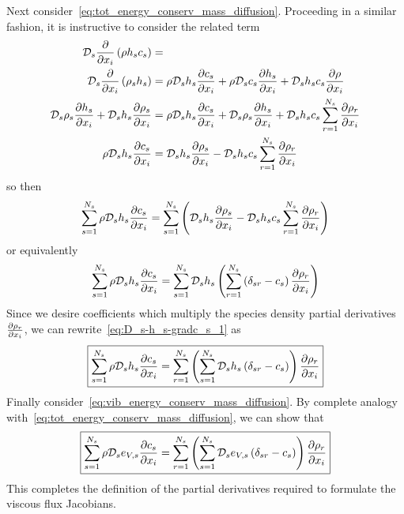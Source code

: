 Next consider~\eqref{eq:tot_energy_conserv_mass_diffusion}.  Proceeding in a similar fashion, it is instructive to consider the related term 
\begin{align*}
\mathcal{D}_s {\frac{\partial{}}{\partial{x_i}}}\left(\rho h_s c_s\right) &= \\
\mathcal{D}_s {\frac{\partial{}}{\partial{x_i}}}\left(\rho_s h_s\right)   &= \rho \mathcal{D}_s h_s {\frac{\partial{c_s}}{\partial{x_i}}} + \rho \mathcal{D}_s c_s {\frac{\partial{h_s}}{\partial{x_i}}} + \mathcal{D}_s h_s c_s {\frac{\partial{\rho}}{\partial{x_i}}} \\
\mathcal{D}_s \rho_s{\frac{\partial{h_s}}{\partial{x_i}}} + \mathcal{D}_s h_s{\frac{\partial{\rho_s}}{\partial{x_i}}} &= \rho \mathcal{D}_s h_s {\frac{\partial{c_s}}{\partial{x_i}}} + \mathcal{D}_s \rho_s {\frac{\partial{h_s}}{\partial{x_i}}} + \mathcal{D}_s h_s c_s \sum_{r=1}^{N_s} {\frac{\partial{\rho_r}}{\partial{x_i}}} \\
\rho \mathcal{D}_s h_s {\frac{\partial{c_s}}{\partial{x_i}}} &= \mathcal{D}_s h_s{\frac{\partial{\rho_s}}{\partial{x_i}}} - \mathcal{D}_s h_s c_s \sum_{r=1}^{N_s} {\frac{\partial{\rho_r}}{\partial{x_i}}}
\end{align*}
so then
\begin{equation*}
\sum_{s=1}^{N_s} \rho \mathcal{D}_s h_s {\frac{\partial{c_s}}{\partial{x_i}}} = \sum_{s=1}^{N_s}\left(\mathcal{D}_s h_s{\frac{\partial{\rho_s}}{\partial{x_i}}} - \mathcal{D}_s h_s c_s \sum_{r=1}^{N_s} {\frac{\partial{\rho_r}}{\partial{x_i}}}\right)
\end{equation*}
or equivalently
\begin{equation}
  \sum_{s=1}^{N_s} \rho \mathcal{D}_s h_s {\frac{\partial{c_s}}{\partial{x_i}}} = \sum_{s=1}^{N_s}\mathcal{D}_s h_s \left(\sum_{r=1}^{N_s}\left(\delta_{sr} - c_s \right){\frac{\partial{\rho_r}}{\partial{x_i}}}\right)
  \label{eq:D_s-h_s-gradc_s_1}
\end{equation}
Since we desire coefficients which multiply the species density partial derivatives ${\frac{\partial{\rho_r}}{\partial{x_i}}}$, we can rewrite~\eqref{eq:D_s-h_s-gradc_s_1} as
\begin{equation}
  \boxed{\sum_{s=1}^{N_s} \rho \mathcal{D}_s h_s {\frac{\partial{c_s}}{\partial{x_i}}} = \sum_{r=1}^{N_s}\left(\sum_{s=1}^{N_s} \mathcal{D}_s h_s \left(\delta_{sr} - c_s \right)\right){\frac{\partial{\rho_r}}{\partial{x_i}}}}
  \label{eq:D_s-h_s-gradc_s}
\end{equation}
Finally consider~\eqref{eq:vib_energy_conserv_mass_diffusion}.  By complete analogy with~\eqref{eq:tot_energy_conserv_mass_diffusion}, we can show that  
\begin{equation}
  \boxed{\sum_{s=1}^{N_s} \rho \mathcal{D}_s e_{V,s} {\frac{\partial{c_s}}{\partial{x_i}}} = \sum_{r=1}^{N_s}\left(\sum_{s=1}^{N_s} \mathcal{D}_s e_{V,s} \left(\delta_{sr} - c_s \right)\right){\frac{\partial{\rho_r}}{\partial{x_i}}}}
\end{equation}
This completes the definition of the partial derivatives required to formulate the viscous flux Jacobians.



